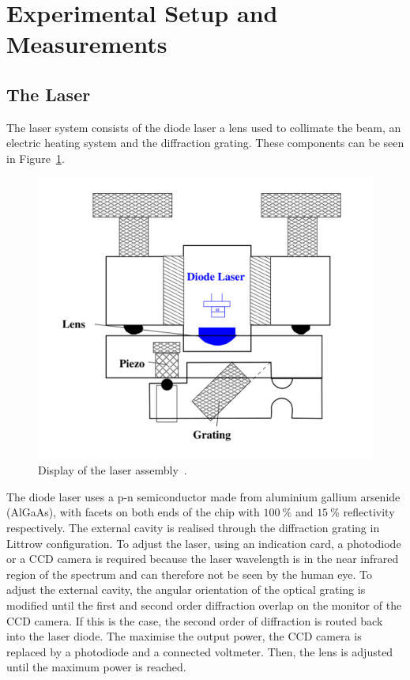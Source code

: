 \section{Experimental Setup and Measurements}
\label{sec:procedure}
\subsection{The Laser}
\label{sec:lasersetup}
The laser system consists of the diode laser a lens used to collimate the beam, an electric heating system
and the diffraction grating. These components can be seen in Figure~\ref{fig:laserhead}.
\begin{figure}[H]
  \centering
  \includegraphics[scale=0.25]{./pictures/Laser-Head.png}
  \caption{Display of the laser assembly~\cite{V61}.}
  \label{fig:laserhead}
\end{figure}
\noindent
The diode laser uses a p-n semiconductor made from aluminium gallium arsenide (AlGaAs), with facets on both ends
of the chip with $\SI{100}{\percent}$ and $\SI{15}{\percent}$ reflectivity respectively. The external cavity
is realised through the diffraction grating in Littrow configuration.
To adjust the laser, using an indication card, a photodiode or a CCD camera is required because the laser
wavelength is in the near infrared region of the spectrum and can therefore not be seen by the human eye.
To adjust the external cavity, the angular orientation of the optical grating is modified until the first and
second order diffraction overlap on the monitor of the CCD camera. If this is the case, the second order of
diffraction is routed back into the laser diode. The maximise the output power, the CCD camera is replaced by a
photodiode and a connected voltmeter. Then, the lens is adjusted until the maximum power is reached.
